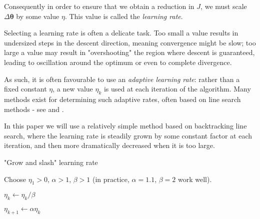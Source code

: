 \documentclass{article}[11pt]
\begin{document}
            Consequently in order to ensure that we obtain a reduction in $J$, we must scale $\Delta \boldsymbol{\theta}$ by some value $\eta$. This value is called the \textit{learning rate}.
            
            Selecting a learning rate is often a delicate task. Too small a value results in undersized steps in the descent direction, meaning convergence might be slow; too large a value may result in "overshooting" the region where descent is guaranteed, leading to oscillation around the optimum or even to complete divergence.
            
            As such, it is often favourable to use an \textit{adaptive learning rate}: rather than a fixed constant $\eta$, a new value $\eta_k$ is used at each iteration of the algorithm. Many methods exist for determining such adaptive rates, often based on line search methods - see \cite{line_search} and \cite{adam}.
            
            In this paper we will use a relatively simple method based on backtracking line search, where the learning rate is steadily grown by some constant factor at each iteration, and then more dramatically decreased when it is too large.
            
            
            \begin{algorithm} \label{alg:grow_and_slash}
                
                \caption{"Grow and slash" learning rate}
                
                \begin{algorithmic}
                
                    \State Choose $\eta_1 > 0$, $\alpha > 1$, $\beta > 1$ (in practice, $\alpha = 1.1$, $\beta = 2$ work well).
                    
                            \State $\eta_k \gets \eta_k / \beta$
                        \EndWhile
                        
                        \State $\eta_{k+1} \gets \alpha \eta_k$
                    \EndFor
                    
                \end{algorithmic}
            
            \end{algorithm}
                    
\end{document}
